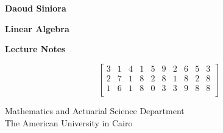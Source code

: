 \documentclass[12pt, a4paper, twoside]{book}
\renewcommand{\arraystretch}{2}
\theoremstyle{plain}
\begin{document}
\begin{titlepage}
\textbf{\Large Daoud Siniora}
\begin{center}
\vspace{3.2cm}
\textbf{\Huge Linear Algebra}

\textbf{\large Lecture Notes}
\end{center}       
\vspace{3.2cm}
{\large
	\begin{center}\[
	\begin{bmatrix}
		3 & 1 & 4 & 1 & 5 & 9 & 2 & 6 & 5 & 3 \\
		2 & 7 & 1 & 8 & 2 & 8 & 1 & 8 & 2 & 8 \\
		1 & 6 & 1 & 8 & 0 & 3 & 3 & 9 & 8 & 8 \\
	\end{bmatrix}
\]
\end{center}
}
\vfill

\begin{center}
Mathematics and Actuarial Science Department\\
The American University in Cairo
\end{center} 
\end{titlepage}~
\thispagestyle{empty}

\tableofcontents

\renewcommand{\arraystretch}{1.2}
\end{document}

